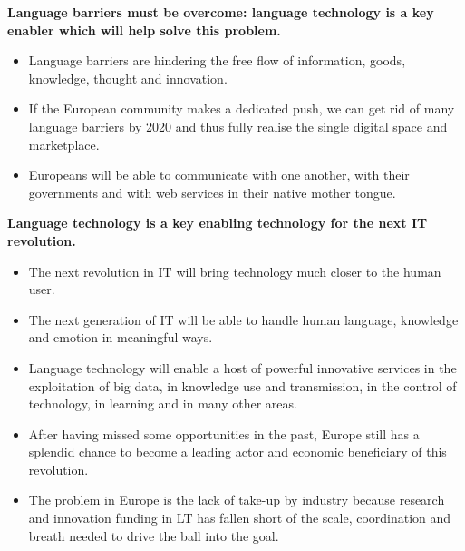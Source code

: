 \documentclass[10pt, plain]{../../metanetpaper}
\begin{document}
\textbf{Language barriers must be overcome: language technology is a key enabler which will help solve this problem.}
\begin{itemize}
\item Language barriers are hindering the free flow of information, goods, knowledge, thought and innovation.
\item If the European community makes a dedicated push, we can get rid of many language barriers by 2020 and thus fully realise the single digital space and marketplace.
\item Europeans will be able to communicate with one another, with their governments and with web services in their native mother tongue.
\end{itemize}

\textbf{Language technology is a key enabling technology for the next IT revolution.}
\begin{itemize}
\item The next revolution in IT will bring technology much closer to the human user.
\item The next generation of IT will be able to handle human language, knowledge and emotion in meaningful ways.
\item Language technology will enable a host of powerful innovative services in the exploitation of big data, in knowledge use and transmission, in the control of technology, in learning and in many other areas.
\item After having missed some opportunities in the past, Europe still has a splendid chance to become a leading actor and economic beneficiary of this revolution.
\item The problem in Europe is the lack of take-up by industry because research and innovation funding in LT has fallen short of the scale, coordination and breath needed to drive the ball into the goal. 
\end{itemize}
\end{document}
